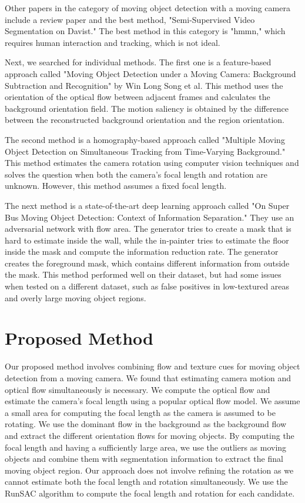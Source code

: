 \documentclass[10pt, twocolumn]{article}
\begin{document}
Other papers in the category of moving object detection with a moving camera include a review paper and the best method, "Semi-Supervised Video Segmentation on Davist." The best method in this category is "hmmn," which requires human interaction and tracking, which is not ideal.

Next, we searched for individual methods. The first one is a feature-based approach called "Moving Object Detection under a Moving Camera: Background Subtraction and Recognition" by Win Long Song et al. This method uses the orientation of the optical flow between adjacent frames and calculates the background orientation field. The motion saliency is obtained by the difference between the reconstructed background orientation and the region orientation.

The second method is a homography-based approach called "Multiple Moving Object Detection on Simultaneous Tracking from Time-Varying Background." This method estimates the camera rotation using computer vision techniques and solves the question when both the camera's focal length and rotation are unknown. However, this method assumes a fixed focal length.

The next method is a state-of-the-art deep learning approach called "On Super Bus Moving Object Detection: Context of Information Separation." They use an adversarial network with flow area. The generator tries to create a mask that is hard to estimate inside the wall, while the in-painter tries to estimate the floor inside the mask and compute the information reduction rate. The generator creates the foreground mask, which contains different information from outside the mask. This method performed well on their dataset, but had some issues when tested on a different dataset, such as false positives in low-textured areas and overly large moving object regions.

\section{Proposed Method}
Our proposed method involves combining flow and texture cues for moving object detection from a moving camera. We found that estimating camera motion and optical flow simultaneously is necessary. We compute the optical flow and estimate the camera's focal length using a popular optical flow model. We assume a small area for computing the focal length as the camera is assumed to be rotating. We use the dominant flow in the background as the background flow and extract the different orientation flows for moving objects. By computing the focal length and having a sufficiently large area, we use the outliers as moving objects and combine them with segmentation information to extract the final moving object region. Our approach does not involve refining the rotation as we cannot estimate both the focal length and rotation simultaneously. We use the RunSAC algorithm to compute the focal length and rotation for each candidate.
\end{document}
